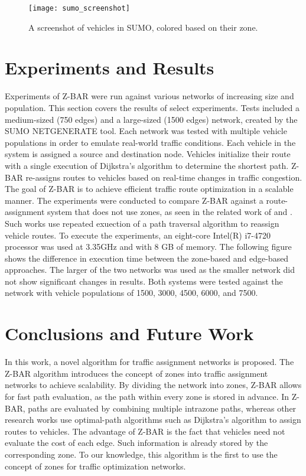 \documentclass[conference]{IEEEtran}
\begin{document}
\begin{figure}[h]
\caption{A screenshot of vehicles in SUMO, colored based on their zone.}
\centering
\texttt{[image: sumo\_screenshot]}
\end{figure}

\section{Experiments and Results} %

Experiments of Z-BAR were run against various networks of increasing size and population. This section covers the results of select experiments. Tests included a medium-sized (750 edges) and a large-sized (1500 edges) network, created by the SUMO NETGENERATE tool. Each network was tested with multiple vehicle populations in order to emulate real-world traffic conditions. Each vehicle in the system is assigned a source and destination node. Vehicles initialize their route with a single execution of Dijkstra's algorithm to determine the shortest path. Z-BAR re-assigns routes to vehicles based on real-time changes in traffic congestion. The goal of Z-BAR is to achieve efficient traffic route optimization in a scalable manner. The experiments were conducted to compare Z-BAR against a route-assignment system that does not use zones, as seen in the related work of \cite{iaco} and \cite{dtpos}. Such works use repeated exuection of a path traversal algorithm to reassign vehicle routes. To execute the experiments, an eight-core Intel(R) i7-4720 processor was used at 3.35GHz and with 8 GB of memory. The following figure shows the difference in execution time between the zone-based and edge-based approaches. The larger of the two networks was used as the smaller network did not show significant changes in results. Both systems were tested against the network with vehicle populations of 1500, 3000, 4500, 6000, and 7500.


\section{Conclusions and Future Work} %

In this work, a novel algorithm for traffic assignment networks is proposed. The Z-BAR algorithm introduces the concept of zones into traffic assignment networks to achieve scalability. By dividing the network into zones, Z-BAR allows for fast path evaluation, as the path within every zone is stored in advance. In Z-BAR, paths are evaluated by combining multiple intrazone paths, whereas other research works use optimal-path algorithms such as Dijkstra's algorithm to assign routes to vehicles. The advantage of Z-BAR is the fact that vehicles need not evaluate the cost of each edge. Such information is already stored by the corresponding zone. To our knowledge, this algorithm is the first to use the concept of zones for traffic optimization networks. 
\end{document}
